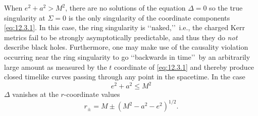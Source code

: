 When \(e^2+a^2>M^2\), there are no solutions of the equation \(\Delta=0\) so the
true singularity at \(\Sigma=0\) is the only singularity of the coordinate components
\eqref{eq:12.3.1}. In this case, the ring singularity is \lq\lq naked,\rq\rq\ i.e., the
charged Kerr metrics fail to be strongly asymptotically predictable, and thus they do
\emph{not} describe black holes. Furthermore, one may make use of the causality
violation occurring near the ring singularity to go \lq\lq backwards in time\rq\rq\ by
an arbitrarily large amount as measured by the \(t\) coordinate of \eqref{eq:12.3.1}
and thereby produce closed timelike curves passing through any point in the
spacetime. In the case
\begin{equation}
 e^2+a^2\le M^2
 \tag{12.3.11}\label{eq:12.3.11}
\end{equation}
\(\Delta\) vanishes at the \(r\)-coordinate values
\begin{equation}
 r_\pm=M\pm(M^2-a^2-e^2)^{1/2}.
 \tag{12.3.12}\label{eq:12.3.12}
\end{equation}

